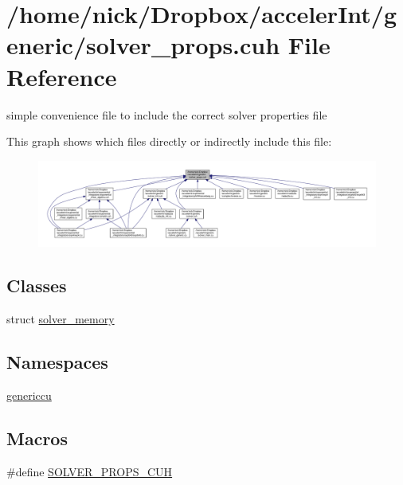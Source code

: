 \hypertarget{solver__props_8cuh}{}\section{/home/nick/\+Dropbox/acceler\+Int/generic/solver\+\_\+props.cuh File Reference}
\label{solver__props_8cuh}


simple convenience file to include the correct solver properties file  


This graph shows which files directly or indirectly include this file\+:
\nopagebreak
\begin{figure}[H]
\begin{center}
\leavevmode
\includegraphics[width=350pt]{solver__props_8cuh__dep__incl}
\end{center}
\end{figure}
\subsection*{Classes}
\begin{DoxyCompactItemize}
\item 
struct \hyperlink{structsolver__memory}{solver\+\_\+memory}
\end{DoxyCompactItemize}
\subsection*{Namespaces}
\begin{DoxyCompactItemize}
\item 
 \hyperlink{namespacegenericcu}{genericcu}
\end{DoxyCompactItemize}
\subsection*{Macros}
\begin{DoxyCompactItemize}
\item 
\#define \hyperlink{solver__props_8cuh_abab1859a388294ac0be0474379ddc940}{S\+O\+L\+V\+E\+R\+\_\+\+P\+R\+O\+P\+S\+\_\+\+C\+UH}
\end{DoxyCompactItemize}

